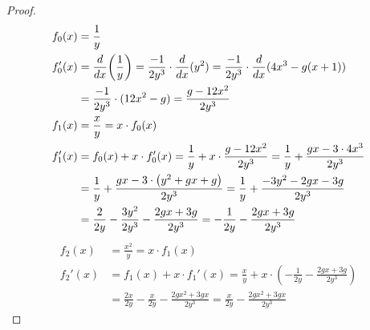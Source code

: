 \begin{proof}
\begin{align*}
    f_0 (x) &=\frac 1 y\\
    f_0'(x) &= \frac{d}{dx}\mathopen{}\left(\frac 1 y\right)\mathclose{} = \frac{-1}{2y^3}\cdot\frac{d}{dx}(y^2) = \frac{-1}{2y^3}\cdot \frac{d}{dx}(4x^3-g(x+1))\\
    &= \frac{-1}{2y^3}\cdot(12x^2-g)=\frac{g-12x^2}{2y^3}\\
    f_1 (x) &=\frac x y = x \cdot f_0(x)\\
    f_1'(x) &=f_0(x)+x\cdot f_0'(x) = \frac 1 y + x \cdot \frac{g-12x^2}{2y^3} = \frac 1 y + \frac{gx-3\cdot 4x^3}{2y^3}\\
            &= \frac 1 y + \frac{gx-3\cdot \left(y^2 + g x +g\right)}{2y^3}
            = \frac 1 y + \frac{-3y^2 - 2 g x -3 g}{2y^3}\\ &= \frac 2 {2y} - \frac{3y^2}{2y^3} - \frac{2gx+3g}{2y^3}
            = -\frac {1} {2y} - \frac{2gx+3g}{2y^3}\end{align*}\begin{align*}
    f_2 (x) &= \frac{x^2}{y} = x\cdot f_1(x)\\
    f_2'(x) &= f_1(x) + x \cdot f_1'(x) = \frac x y + x \cdot \left(-\frac {1} {2y} - \frac{2gx+3g}{2y^3}\right)\\
            &=\frac {2x} {2y} -\frac {x} {2y} - \frac{2gx^2+3gx}{2y^3} = \frac {x} {2y} - \frac{2gx^2+3gx}{2y^3}
\end{align*}


\end{proof}
